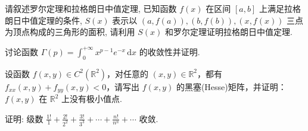 请叙述罗尔定理和拉格朗日中值定理, 已知函数 $f(x)$ 在区间 $[a, b]$ 上满足拉格朗日中值定理的条件, $S(x)$ 表示以 $(a, f(a)), (b, f(b)), (x, f(x))$ 三点为顶点构成的三角形的面积, 请利用 $S(x)$ 和罗尔定理证明拉格朗日中值定理.\par
讨论函数 $\Gamma(p) = \int_{0}^{+\infty} x^{p-1} e^{-x} \, \mathrm{d}x$ 的收敛性并证明.\par
设函数 $f(x, y) \in C^2(\mathbb{R}^2)$，对任意的 $(x, y) \in \mathbb{R}^2$，都有 $f_{xx}(x, y) + f_{yy}(x, y) < 0$，请写出 $f(x, y)$ 的黑塞(Hesse)矩阵，并证明：$f(x, y)$ 在 $\mathbb{R}^2$ 上没有极小值点.\par
证明: 级数 $\frac{1!}{1} + \frac{2!}{2^2} + \frac{3!}{3^3} + \cdots + \frac{n!}{n^n} + \cdots$ 收敛.\par
